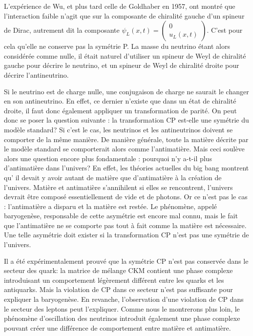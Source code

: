 			L'expérience de Wu, et plus tard celle de Goldhaber\cite{Goldhaber1958} en 1957, ont montré que l'interaction faible n'agit que sur la composante de chiralité gauche d'un spineur de Dirac, autrement dit la composante $\psi_L(x,t)=\left(\begin{matrix}0 \\ u_L(x,t)\end{matrix}\right)$. C'est pour cela qu'elle ne conserve pas la symétrie P. La masse du neutrino étant alors considérée comme nulle, il était naturel d'utiliser un spineur de Weyl de chiralité gauche pour décrire le neutrino, et un spineur de Weyl de chiralité droite pour décrire l'antineutrino.
			
			Si le neutrino est de charge nulle, une conjugaison de charge ne saurait le changer en son antineutrino. En effet, ce dernier n'existe que dans un état de chiralité droite, il faut donc également appliquer un transformation de parité. On peut donc se poser la question suivante : la transformation CP est-elle une symétrie du modèle standard? Si c'est le cas, les neutrinos et les antineutrinos doivent se comporter de la même manière. De manière générale, toute la matière décrite par le modèle standard se comporterait alors comme l'antimatière. Mais ceci soulève alors une question encore plus fondamentale : pourquoi n'y a-t-il plus d'antimatière dans l'univers? En effet, les théories actuelles du big bang\cite{Canetti2012} montrent qu' il devait y avoir autant de matière que d'antimatière à la création de l'univers. Matière et antimatière s'annihilent si elles se rencontrent, l'univers devrait être composé essentiellement de vide et de photons. Or ce n'est pas le cas : l'antimatière a disparu et la matière est restée. Le phénomène, appelé baryogenèse, responsable de cette asymétrie est encore mal connu, mais le fait que l'antimatière ne se comporte pas tout à fait comme la matière est nécessaire\cite{Sakharov1991}. Une telle asymétrie doit exister si la transformation CP n'est pas une symétrie de l'univers.
			
			Il a été expérimentalement prouvé que la symétrie CP n'est pas conservée dans le secteur des quark\cite{Collaboration2006,Charles2004,Kobayashi1973}: la matrice de mélange CKM contient une phase complexe introduisant un comportement légèrement différent entre les quarks et les antiquarks. Mais la violation de CP dans ce secteur n'est pas suffisante pour expliquer la baryogenèse\cite{Riotto1998}. En revanche, l'observation d'une violation de CP dans le secteur des leptons peut l'expliquer\cite{Davidson2008}. Comme nous le montrerons plus loin, le phénomène d'oscillation des neutrinos introduit également une phase complexe pouvant créer une différence de comportement entre matière et antimatière.
        

